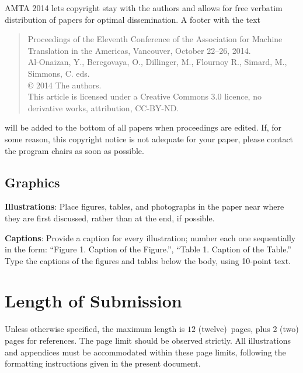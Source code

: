 \documentclass[]{article}
\newcommand{\confname}{AMTA 2014}
\newcommand{\paperlength}{$12$ (twelve)}
\newcommand{\shortpaperlength}{$6$ (six)}
\begin{document}
\confname{} lets copyright stay with the authors and allows for free verbatim distribution of papers for optimal dissemination. A footer with the text
\begin{quote}
\begin{small}
\begin{it}
  Proceedings of the Eleventh Conference of the Association for Machine Translation in the Americas, Vancouver, October 22–26, 2014.\\
  Al-Onaizan, Y., Beregovaya, O., Dillinger, M., Flournoy R., Simard,
  M., Simmons, C. eds.\\
  \copyright{} 2014 The authors.\\
  This article is licensed under a Creative Commons 3.0 licence, no
  derivative works, attribution, CC-BY-ND.
\end{it}
\end{small}
\end{quote}
will be added to the bottom of all papers when proceedings are
edited. If, for some reason, this copyright notice is not adequate for
your paper, please contact the program chairs as soon as possible. 

\subsection{Graphics}

{\bf Illustrations}: Place figures, tables, and photo\-graphs in the
paper near where they are first discussed, rather than at the end, if
possible.

{\bf Captions}: Provide a caption for every illustration; number
each one sequentially in the form:  ``Figure 1. Caption of the
Figure.'', ``Table 1. Caption of the Table.''  Type the captions of
the figures and tables below the body, using 10-point text.

\section{Length of Submission}
\label{sec:length}

Unless otherwise specified, the maximum length is \paperlength~pages,
plus 2 (two) pages for references. 
The page limit should be observed strictly. All illustrations and
appendices must be accommodated within these page limits, following
the formatting instructions given in the present document.

\small



\end{document}
